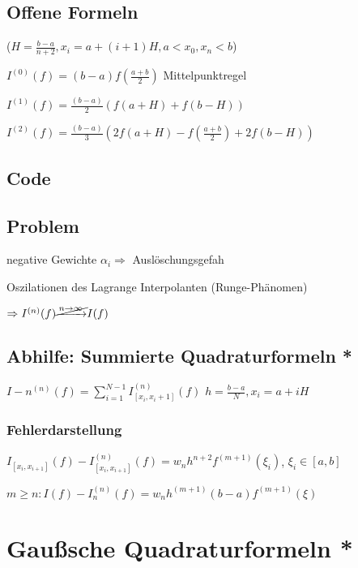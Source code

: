 \documentclass[12pt,a4paper]{article} %
\newcommand*\tab[1][1cm]{\hspace*{#1}}
\begin{document}
	\subsection{Offene Formeln}
	
	($H = \frac{b - a}{n + 2}, x_i = a + (i + 1)H, a < x_0, x_n < b$)
	
	$I^{(0)}(f) = (b - a)f(\frac{a + b}{2})$ \tab Mittelpunktregel
	
	$I^{(1)}(f) = \frac{(b - a)}{2}(f(a + H) + f(b - H))$
	
	$I^{(2)}(f) = \frac{(b-  a)}{3}(2f(a + H) - f(\frac{a + b}{2}) + 2f(b - H))$
	
	\subsection{Code}
	
	\subsection{Problem}
	
	negative Gewichte $\alpha_i \Rightarrow$ Auslöschungsgefah
	
	Oszilationen des Lagrange Interpolanten (Runge-Phänomen) 
	
	$\Rightarrow I^{(n)}(f)\cancel{\xrightarrow{n \rightarrow\infty}}I(f) $
	
	\subsection{Abhilfe: Summierte Quadraturformeln *}
	
	$I-n^{(n)}(f) = \sum\limits_{i = 1}^{N - 1}I_{[x_i, x_i + 1]}^{(n)}(f)$ \tab $h = \frac{b - a}{N}, x_i = a + iH$
	
	\subsubsection{Fehlerdarstellung}
	
	$I_{[x_i, x_{i + 1}]}(f) - I_{[x_i, x_{i + 1}]}^{(n)}(f) = w_nh^{n + 2}f^{(m + 1)}(\xi_i)$, \tab $\xi_i \in [a, b]$
	
	$m \ge n: I(f) - I_n^{(n)}(f) = w_nh^{(m + 1)}(b - a)f^{(m + 1)}(\xi)$
	
	\newpage
	
	\section{Gaußsche Quadraturformeln *}
	
\end{document}

